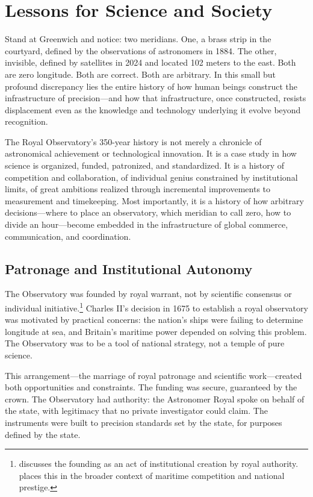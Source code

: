 \chapter{Lessons for Science and Society}
\label{ch:lessons-science-society}

Stand at Greenwich and notice: two meridians. One, a brass strip in the courtyard, defined by the observations of astronomers in 1884. The other, invisible, defined by satellites in 2024 and located 102 meters to the east. Both are zero longitude. Both are correct. Both are arbitrary. In this small but profound discrepancy lies the entire history of how human beings construct the infrastructure of precision---and how that infrastructure, once constructed, resists displacement even as the knowledge and technology underlying it evolve beyond recognition.

The Royal Observatory's 350-year history is not merely a chronicle of astronomical achievement or technological innovation. It is a case study in how science is organized, funded, patronized, and standardized. It is a history of competition and collaboration, of individual genius constrained by institutional limits, of great ambitions realized through incremental improvements to measurement and timekeeping. Most importantly, it is a history of how arbitrary decisions---where to place an observatory, which meridian to call zero, how to divide an hour---become embedded in the infrastructure of global commerce, communication, and coordination.

\section{Patronage and Institutional Autonomy}

The Observatory was founded by royal warrant, not by scientific consensus or individual initiative.\footnote{\textcite{Chapman1996} discusses the founding as an act of institutional creation by royal authority. \textcite{Howse1980} places this in the broader context of maritime competition and national prestige.} Charles II's decision in 1675 to establish a royal observatory was motivated by practical concerns: the nation's ships were failing to determine longitude at sea, and Britain's maritime power depended on solving this problem. The Observatory was to be a tool of national strategy, not a temple of pure science.

This arrangement---the marriage of royal patronage and scientific work---created both opportunities and constraints. The funding was secure, guaranteed by the crown. The Observatory had authority: the Astronomer Royal spoke on behalf of the state, with legitimacy that no private investigator could claim. The instruments were built to precision standards set by the state, for purposes defined by the state.

